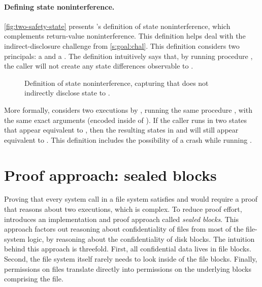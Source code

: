 \paragraph{Defining state noninterference.}

\autoref{fig:two-safety-state} presents \sys's definition
of state noninterference, which complements return-value
noninterference.  This definition helps \sys deal with the indirect-disclosure
challenge from \autoref{s:goal:chal}.  This definition
considers two principals: a  and a .  The definition
intuitively says that, by running procedure , the caller will not
create any state differences observable to .

\begin{figure}[ht]
  
  \caption{Definition of state noninterference, capturing that 
    does not indirectly disclose state to .}
  \label{fig:two-safety-state}
\end{figure}

More formally,  considers two executions
by , running the same procedure , with the same exact
arguments (encoded inside of ).  If the caller runs  in two
states that appear equivalent to , then the resulting states
in  and  will still appear equivalent to .
This definition includes the possibility of a crash while running .

\section{Proof approach: sealed blocks}
\label{s:proof}

Proving that every system call in a file system satisfies
 and  would require
a proof that reasons about two executions, which is complex.  To reduce
proof effort, \sys introduces an implementation and proof approach
called \emph{sealed blocks}.  This approach factors out reasoning
about confidentiality of files from most of the file-system logic,
by reasoning about the confidentiality of disk blocks.  The intuition
behind this approach is threefold.  First, all confidential data lives
in file blocks.  Second, the file system itself rarely needs to look
inside of the file blocks.  Finally, permissions on files translate
directly into permissions on the underlying blocks comprising the file.


